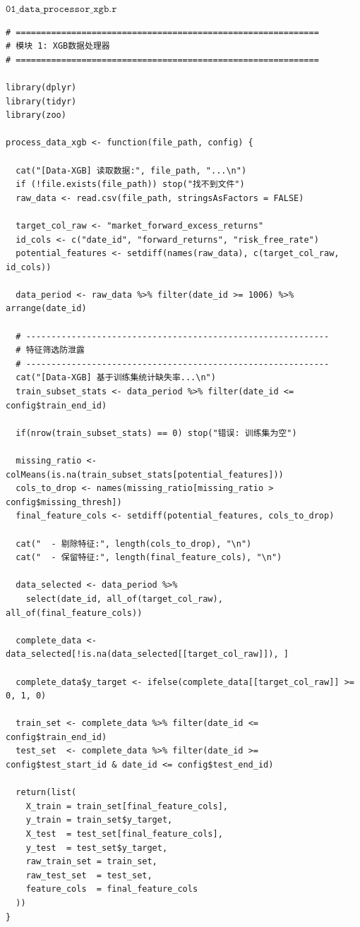 \documentclass[11pt, a4paper]{article}
\begin{document}
$\texttt{01\_data\_processor\_xgb.r}$
\begin{verbatim}
# ============================================================
# 模块 1: XGB数据处理器
# ============================================================

library(dplyr)
library(tidyr)
library(zoo)

process_data_xgb <- function(file_path, config) {
  
  cat("[Data-XGB] 读取数据:", file_path, "...\n")
  if (!file.exists(file_path)) stop("找不到文件")
  raw_data <- read.csv(file_path, stringsAsFactors = FALSE)
  
  target_col_raw <- "market_forward_excess_returns"
  id_cols <- c("date_id", "forward_returns", "risk_free_rate")
  potential_features <- setdiff(names(raw_data), c(target_col_raw, id_cols))

  data_period <- raw_data %>% filter(date_id >= 1006) %>% arrange(date_id)
  
  # ------------------------------------------------------------
  # 特征筛选防泄露
  # ------------------------------------------------------------
  cat("[Data-XGB] 基于训练集统计缺失率...\n")
  train_subset_stats <- data_period %>% filter(date_id <= config$train_end_id)
  
  if(nrow(train_subset_stats) == 0) stop("错误: 训练集为空")
  
  missing_ratio <- colMeans(is.na(train_subset_stats[potential_features]))
  cols_to_drop <- names(missing_ratio[missing_ratio > config$missing_thresh])
  final_feature_cols <- setdiff(potential_features, cols_to_drop)
  
  cat("  - 剔除特征:", length(cols_to_drop), "\n")
  cat("  - 保留特征:", length(final_feature_cols), "\n")
  
  data_selected <- data_period %>% 
    select(date_id, all_of(target_col_raw), all_of(final_feature_cols))
  
  complete_data <- data_selected[!is.na(data_selected[[target_col_raw]]), ]
  
  complete_data$y_target <- ifelse(complete_data[[target_col_raw]] >= 0, 1, 0)
  
  train_set <- complete_data %>% filter(date_id <= config$train_end_id)
  test_set  <- complete_data %>% filter(date_id >= config$test_start_id & date_id <= config$test_end_id)
  
  return(list(
    X_train = train_set[final_feature_cols],
    y_train = train_set$y_target,
    X_test  = test_set[final_feature_cols],
    y_test  = test_set$y_target,
    raw_train_set = train_set,
    raw_test_set  = test_set,
    feature_cols  = final_feature_cols
  ))
}
\end{verbatim}
\end{document}

